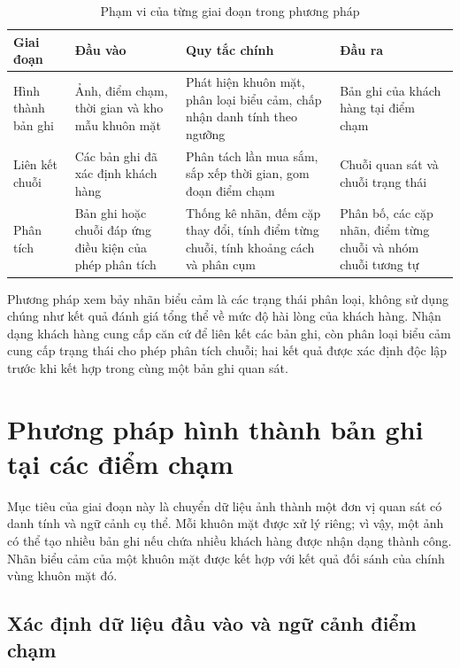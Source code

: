 \documentclass[../LuanVan.tex]{subfiles}
\begin{document}
\begin{table}[H]
    \centering
    \caption{Phạm vi của từng giai đoạn trong phương pháp}
    \label{tab:solution_stage_io}
    \small
    \begin{tabular}{|>{\raggedright\arraybackslash}p{2.4cm}|>{\raggedright\arraybackslash}p{3.2cm}|>{\raggedright\arraybackslash}p{4.0cm}|>{\raggedright\arraybackslash}p{3.1cm}|}
        \hline
        \textbf{Giai đoạn} & \textbf{Đầu vào} & \textbf{Quy tắc chính} & \textbf{Đầu ra} \\
        \hline
        Hình thành bản ghi & Ảnh, điểm chạm, thời gian và kho mẫu khuôn mặt & Phát hiện khuôn mặt, phân loại biểu cảm, chấp nhận danh tính theo ngưỡng & Bản ghi của khách hàng tại điểm chạm \\
        \hline
        Liên kết chuỗi & Các bản ghi đã xác định khách hàng & Phân tách lần mua sắm, sắp xếp thời gian, gom đoạn điểm chạm & Chuỗi quan sát và chuỗi trạng thái \\
        \hline
        Phân tích & Bản ghi hoặc chuỗi đáp ứng điều kiện của phép phân tích & Thống kê nhãn, đếm cặp thay đổi, tính điểm từng chuỗi, tính khoảng cách và phân cụm & Phân bố, các cặp nhãn, điểm từng chuỗi và nhóm chuỗi tương tự \\
        \hline
    \end{tabular}
\end{table}

Phương pháp xem bảy nhãn biểu cảm là các trạng thái phân loại, không sử dụng chúng như kết quả đánh giá tổng thể về mức độ hài lòng của khách hàng. Nhận dạng khách hàng cung cấp căn cứ để liên kết các bản ghi, còn phân loại biểu cảm cung cấp trạng thái cho phép phân tích chuỗi; hai kết quả được xác định độc lập trước khi kết hợp trong cùng một bản ghi quan sát.

\section{Phương pháp hình thành bản ghi tại các điểm chạm}
\label{section:3.2}

Mục tiêu của giai đoạn này là chuyển dữ liệu ảnh thành một đơn vị quan sát có danh tính và ngữ cảnh cụ thể. Mỗi khuôn mặt được xử lý riêng; vì vậy, một ảnh có thể tạo nhiều bản ghi nếu chứa nhiều khách hàng được nhận dạng thành công. 
Nhãn biểu cảm của một khuôn mặt được kết hợp với kết quả đối sánh của chính vùng khuôn mặt đó.

\subsection{Xác định dữ liệu đầu vào và ngữ cảnh điểm chạm}
\label{subsection:3.2.1}
\end{document}
